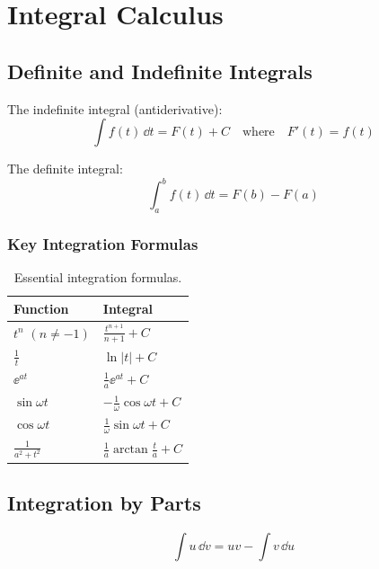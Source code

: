 

\section{Integral Calculus}

\subsection{Definite and Indefinite Integrals}

The indefinite integral (antiderivative):
\begin{equation}
\int f(t) \, \dd t = F(t) + C \quad \text{where} \quad F'(t) = f(t)
\end{equation}

The definite integral:
\begin{equation}
\int_a^b f(t) \, \dd t = F(b) - F(a)
\end{equation}



\subsubsection{Key Integration Formulas}

\begin{table}[htbp]
\centering
\begin{tabular}{ll}
\toprule
\textbf{Function} & \textbf{Integral} \\
\midrule
$t^n$ $(n \neq -1)$ & $\frac{t^{n+1}}{n+1} + C$ \\
$\frac{1}{t}$ & $\ln|t| + C$ \\
$\ee^{at}$ & $\frac{1}{a}\ee^{at} + C$ \\
$\sin\omega t$ & $-\frac{1}{\omega}\cos\omega t + C$ \\
$\cos\omega t$ & $\frac{1}{\omega}\sin\omega t + C$ \\
$\frac{1}{a^2 + t^2}$ & $\frac{1}{a}\arctan\frac{t}{a} + C$ \\
\bottomrule
\end{tabular}
\caption{Essential integration formulas.}
\label{tab:int_rules}
\end{table}

\subsection{Integration by Parts}

\begin{equation}
\int u \, \dd v = uv - \int v \, \dd u
\end{equation}


